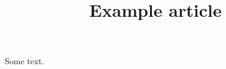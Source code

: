 \documentclass[11pt]{article}
\title{Example article}
\begin{document}
\tiny
Some text.

\cite{kasprzak2001a}
\nocite{*}



\end{document}
